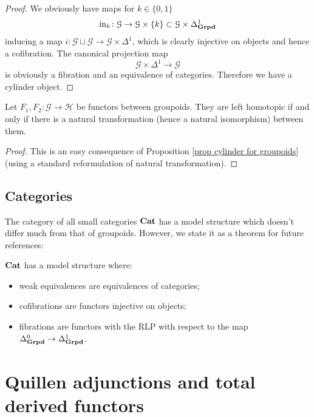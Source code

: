 \begin{refsection}
\begin{proof}
We obviously have maps for $k \in \{0,1\}$
\[
\mathrm{in}_k \colon \mathcal G \to \mathcal G \times \{k\} \subset \mathcal G \times \Delta^1_{\mathbf{Grpd}}
\]
inducing a map $i \colon \mathcal G \sqcup \mathcal G \to \mathcal G \times \Delta^1$, which is clearly injective on objects and hence a cofibration. The canonical projection map
\[
\mathcal G \times \Delta^1 \to \mathcal G
\]
is obviously a fibration and an equivalence of categories. Therefore we have a cylinder object.
\end{proof}

\begin{cor}
Let $F_1,F_2 \colon \mathcal G \to \mathcal H$ be functors between groupoids. They are left homotopic if and only if there is a natural transformation (hence a natural isomorphism) between them.
\end{cor}

\begin{proof}
This is an easy consequence of Proposition \ref{prop cylinder for groupoids} (using a standard reformulation of natural transformation).
\end{proof}

\subsection{Categories} \label{model structure on cat}

The category of all small categories $\mathbf{Cat}$ has a model structure which doesn't differ much from that of groupoids. However, we state it as a theorem for future references:

\begin{thm} \label{thm model structure on cat}
$\mathbf{Cat}$ has a model structure where:
\begin{itemize}
\item weak equivalences are equivalences of categories;
\item cofibrations are functors injective on objects;
\item fibrations are functors with the RLP with respect to the map $\Delta^0_{\mathbf{Grpd}} \to \Delta^1_{\mathbf{Grpd}}$.
\end{itemize}
\end{thm}


\section{Quillen adjunctions and total derived functors}


\end{refsection}

